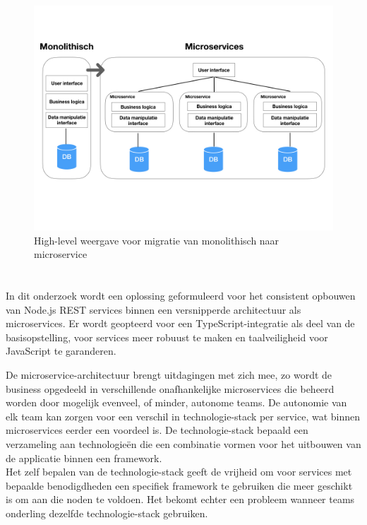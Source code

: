 \begin{figure}[H]
    \includegraphics[width=\linewidth]{img/Microservices.jpeg}
    \caption[Monolithisch naar microservices]{High-level weergave voor migratie van monolithisch naar microservice}
    \label{fig:microservices}
\end{figure}

\section{}
\label{sec:probleemstelling}


In dit onderzoek wordt een oplossing geformuleerd voor het consistent opbouwen van Node.js \gls{REST} services binnen een versnipperde architectuur als microservices. Er wordt geopteerd voor een TypeScript-integratie als deel van de basisopstelling, voor services meer robuust te maken en taalveiligheid voor JavaScript te garanderen.

De microservice-architectuur brengt uitdagingen met zich mee, zo wordt de business opgedeeld in verschillende onafhankelijke microservices die beheerd worden door mogelijk evenveel, of minder, autonome teams. De autonomie van elk team kan zorgen voor een verschil in technologie-stack per service, wat binnen microservices eerder een voordeel is. De technologie-stack bepaald een verzameling aan technologieën die een combinatie vormen voor het uitbouwen van de applicatie binnen een framework. \\
Het zelf bepalen van de technologie-stack geeft de vrijheid om voor services met bepaalde benodigdheden een specifiek framework te gebruiken die meer geschikt is om aan die noden te voldoen. Het bekomt echter een probleem wanneer teams onderling dezelfde technologie-stack gebruiken. 

